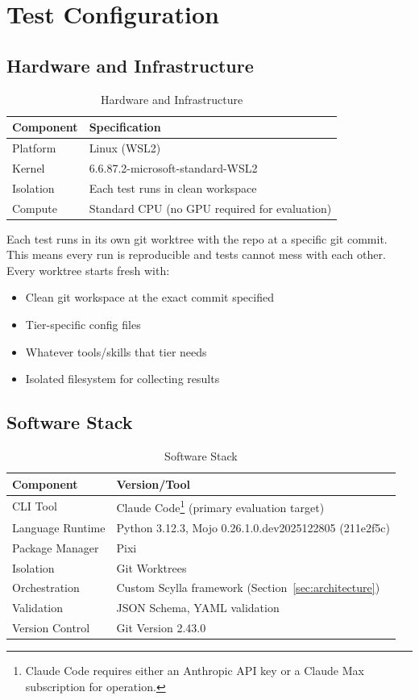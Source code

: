 \documentclass[11pt]{article}
\begin{document}
\section{Test Configuration}

\subsection{Hardware and Infrastructure}


\begin{table}[htbp]
\centering
\caption{Hardware and Infrastructure}
\begin{tabular}{ll}
\toprule
Component & Specification \\
\midrule
Platform & Linux (WSL2) \\
Kernel & 6.6.87.2-microsoft-standard-WSL2 \\
Isolation & Each test runs in clean workspace \\
Compute & Standard CPU (no GPU required for evaluation) \\
\bottomrule
\end{tabular}
\end{table}


Each test runs in its own git worktree with the repo at a specific git
commit. This means every run is reproducible and tests cannot mess with each
other. Every worktree starts fresh with:

\begin{itemize}
\item Clean git workspace at the exact commit specified
\item Tier-specific config files
\item Whatever tools/skills that tier needs
\item Isolated filesystem for collecting results
\end{itemize}

\subsection{Software Stack}


\begin{table}[htbp]
\centering
\caption{Software Stack}
\begin{tabular}{ll}
\toprule
Component & Version/Tool \\
\midrule
CLI Tool & Claude Code\footnote{Claude Code requires either an Anthropic API key or a Claude Max subscription for operation.} (primary evaluation target) \\
Language Runtime & Python 3.12.3, Mojo 0.26.1.0.dev2025122805 (211e2f5c) \\
Package Manager & Pixi \\
Isolation & Git Worktrees \\
Orchestration & Custom Scylla framework (Section~\ref{sec:architecture}) \\
Validation & JSON Schema, YAML validation \\
Version Control & Git Version 2.43.0 \\
\bottomrule
\end{tabular}
\end{table}
\end{document}
